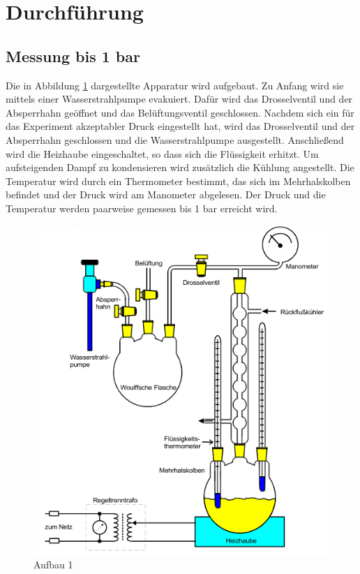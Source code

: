 \section{Durchführung}
\label{sec:Durchführung}

\subsection{Messung bis 1 bar}
Die in Abbildung \ref{fig:aufbau1} dargestellte Apparatur wird aufgebaut. Zu Anfang wird sie mittels einer Wasserstrahlpumpe evakuiert.
Dafür wird das Drosselventil und der Absperrhahn geöffnet und das Belüftungsventil geschlossen. Nachdem sich ein für das Experiment akzeptabler Druck eingestellt hat, wird das
Drosselventil und der Absperrhahn geschlossen und die Wasserstrahlpumpe ausgestellt. Anschließend wird die Heizhaube eingeschaltet, so dass sich die Flüssigkeit erhitzt. Um 
aufsteigenden Dampf zu kondensieren wird zusätzlich die Kühlung angestellt. Die Temperatur wird durch ein Thermometer bestimmt, das sich im Mehrhalskolben befindet und der Druck
wird am Manometer abgelesen. Der Druck und die Temperatur werden paarweise gemessen bis 1 bar erreicht wird.
\begin{figure}
    \centering
    \includegraphics{Aufbau1.png}
    \caption{Aufbau 1 \cite{sample}}
    \label{fig:aufbau1}
\end{figure}

